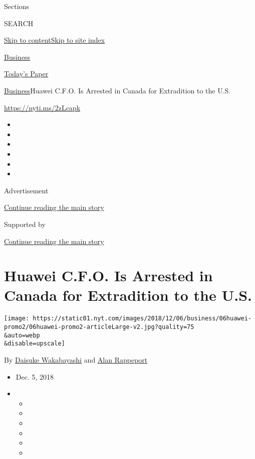 Sections

SEARCH

\protect\hyperlink{site-content}{Skip to
content}\protect\hyperlink{site-index}{Skip to site index}

\href{https://www.nytimes.com/section/business}{Business}

\href{https://myaccount.nytimes.com/auth/login?response_type=cookie\&client_id=vi}{}

\href{https://www.nytimes.com/section/todayspaper}{Today's Paper}

\href{/section/business}{Business}\textbar{}Huawei C.F.O. Is Arrested in
Canada for Extradition to the U.S.

\url{https://nyti.ms/2zLcapk}

\begin{itemize}
\item
\item
\item
\item
\item
\item
\end{itemize}

Advertisement

\protect\hyperlink{after-top}{Continue reading the main story}

Supported by

\protect\hyperlink{after-sponsor}{Continue reading the main story}

\hypertarget{huawei-cfo-is-arrested-in-canada-for-extradition-to-the-us}{%
\section{Huawei C.F.O. Is Arrested in Canada for Extradition to the
U.S.}\label{huawei-cfo-is-arrested-in-canada-for-extradition-to-the-us}}

\texttt{[image: https://static01.nyt.com/images/2018/12/06/business/06huawei-promo2/06huawei-promo2-articleLarge-v2.jpg?quality=75\\\&auto=webp\\\&disable=upscale]}

By \href{https://www.nytimes.com/by/daisuke-wakabayashi}{Daisuke
Wakabayashi} and \href{https://www.nytimes.com/by/alan-rappeport}{Alan
Rappeport}

\begin{itemize}
\item
  Dec. 5, 2018
\item
  \begin{itemize}
  \item
  \item
  \item
  \item
  \item
  \item
  \end{itemize}
\end{itemize}

